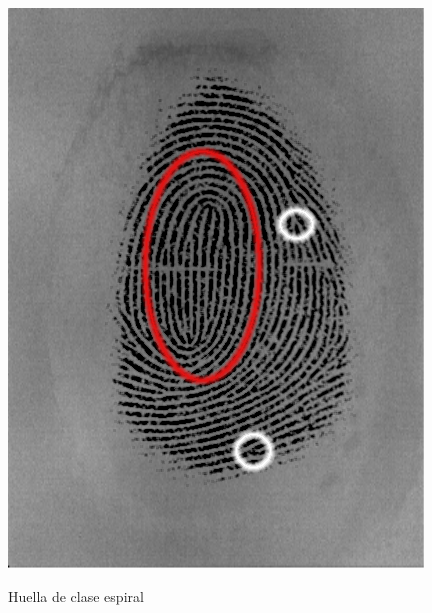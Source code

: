 \documentclass[10pt,a4paper]{article}
\begin{document}
\begin{figure}[h!]
  \centering
  \includegraphics[scale=0.6]{1/whorl.png}\\
  \caption{Huella de clase espiral}
  \label{fig:whirl}
\end{figure}

\pagebreak
\end{document}
